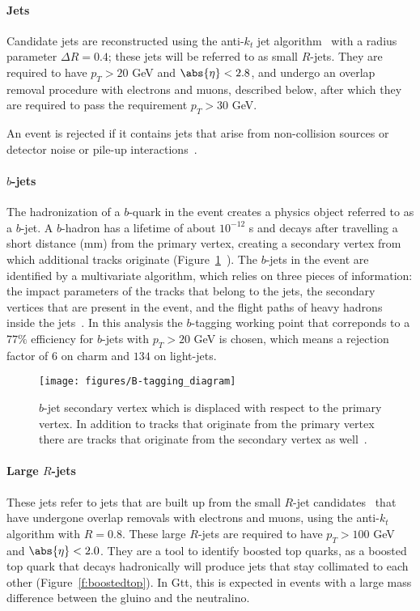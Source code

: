 \paragraph{Jets} Candidate jets are reconstructed using the anti-$k_t$ jet
algorithm~\cite{PERF-2014-07, Cacciari:2008gp, Cacciari:2011ma} with a radius
parameter $\Delta R = 0.4$; these jets will be referred to as small $R$-jets.
They are required to have $p_T > 20$ GeV and $\abs{\eta} < 2.8$, and undergo an
overlap removal procedure with electrons and muons, described below, after
which they are required to pass the requirement $p_T > 30$ GeV.

An event is rejected if it contains jets that arise from non-collision sources
or detector noise or pile-up interactions~\cite{ATLAS-CONF-2015-029}.

\paragraph{$b$-jets} The hadronization of a $b$-quark in the event creates a
physics object referred to as a $b$-jet. A $b$-hadron has a lifetime of about
$10^{-12}$ s and decays after travelling a short distance (mm) from the primary
vertex, creating a secondary vertex from which additional tracks originate
(Figure~\ref{f:btagging}~\cite{bjetwiki}). The $b$-jets in the event are
identified by a multivariate algorithm, which relies on three pieces of
information: the impact parameters of the tracks that belong to the jets, the
secondary vertices that are present in the event, and the flight paths of heavy
hadrons inside the jets~\cite{PERF-2012-04,ATL-PHYS-PUB-2016-012}. In this
analysis the $b$-tagging working point that correponds to a $77\%$ efficiency
for $b$-jets with $p_T >20$ GeV is chosen, which means a rejection factor of
$6$ on charm and $134$ on light-jets.

\begin{figure}[H]
	\texttt{[image: figures/B-tagging\_diagram]}
	\centering

	\caption{$b$-jet secondary vertex which is displaced with respect to the
		primary vertex. In addition to tracks that originate from the primary vertex
		there are tracks that originate from the secondary vertex as
		well~\cite{bjetwiki}.}

	\label{f:btagging}
\end{figure}


\paragraph{Large $R$-jets} These jets refer to jets that are built up from the
small $R$-jet candidates~\cite{Nachman:2014kla} that have undergone overlap
removals with electrons and muons, using the anti-$k_t$ algorithm with $R=0.8$.
These large $R$-jets are required to have $p_T > 100$ GeV and $\abs{\eta} <
	2.0$. They are a tool to identify boosted top quarks, as a boosted top quark
that decays hadronically will produce jets that stay collimated to each other
(Figure~\ref{f:boostedtop}). In Gtt, this is expected in events with a large
mass difference between the gluino and the neutralino.


